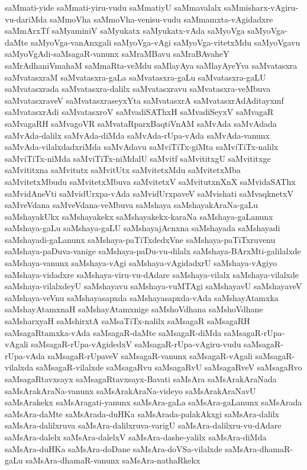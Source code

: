 {saMmati-yide
saMmati-yiru-vudu
saMmatiyU
saMmavalalx
saMmisharx-vAgiru-vu-dariMda
saMmoVha
saMmoVha-venisu-vudu
saMmamxta-vAgidadxre
saMmArxTf
saMyaminiV
saMyukatx
saMyukatx-vAda
saMyoVga
saMyoVga-daMte
saMyoVga-vanAnxgali
saMyoVga-vAgi
saMyoVga-vitetxMdu
saMyoVgavu
saMyoVgAdi-saMsagaR-vanunx
saMraMBavu
saMraBAvaheY
saMrAdhaniVmahaM
saMmaRta-veMdu
saMlayAya
saMlayAyeYva
saMvatasxra
saMvatasxraM
saMvatasxra-gaLa
saMvatasxra-gaLu
saMvatasxra-gaLU
saMvatasxrada
saMvatasxra-dalilx
saMvatasxravu
saMvatasxra-veMbuva
saMvatasxraveV
saMvatasxraseyxYta
saMvatasxrA
saMvatasxrAdAditayxmf
saMvatasxrAdi
saMvatasxroV
saMvadiSAThxH
saMvadiSeyxV
saMvagaR
saMvagaRH
saMvagoVR
saMvataRparxBaqtiVnAM
saMvAda
saMvAdada
saMvAda-dalilx
saMvAda-diMda
saMvAda-rUpa-vAda
saMvAda-vanunx
saMvAda-vilalxdadxriMda
saMvAdavu
saMviTiTx-giMta
saMviTiTx-nalilx
saMviTiTx-niMda
saMviTiTx-niMdalU
saMvitf
saMvititxgU
saMvititxge
saMvititxna
saMvitutx
saMvitUtx
saMvitetxMdu
saMvitetxMba
saMvitetxMbudu
saMvitetxMbuva
saMvitetxV
saMvitutxnXnX
saMvidaSAThx
saMvidAneVti
saMvidUrxpa-vAda
saMvidUrxpaveV
saMvishati
saMvaqknetxV
saMveVdana
saMveVdana-veMbuva
saMshaya
saMshayakAraNa-gaLu
saMshayakUkx
saMshayakekx
saMshayakekx-karaNa
saMshaya-gaLanunx
saMshaya-gaLu
saMshaya-gaLU
saMshayajAcnxna
saMshayada
saMshayadi
saMshayadi-gaLanunx
saMshaya-paTiTxdedxVne
saMshaya-paTiTxruvenu
saMshaya-paDuva-vanige
saMshaya-paDu-vu-dilalx
saMshaya-BArxMti-galilalxde
saMshaya-vanunx
saMshaya-vAgi
saMshaya-vAgidadxrU
saMshaya-vAgiyo
saMshaya-vidadxre
saMshaya-viru-vu-dAdare
saMshaya-vilalx
saMshaya-vilalxde
saMshaya-vilalxdeyU
saMshayavu
saMshaya-vuMTAgi
saMshayavU
saMshayaveV
saMshaya-veVnu
saMshayasapxda
saMshayasapxda-vAda
saMshayAtamxka
saMshayAtamxnaH
saMshayAtamxnige
saMshoVdhana
saMshoVdhane
saMsharxyaH
saMshirxtA
saMsaTiTx-nalilx
saMsagaR
saMsagaRH
saMsagaRtamxka-vAda
saMsagaR-daMte
saMsagaR-diMda
saMsagaR-rUpa-vAgali
saMsagaR-rUpa-vAgidedxV
saMsagaR-rUpa-vAgiru-vudu
saMsagaR-rUpa-vAda
saMsagaR-rUpaveV
saMsagaR-vanunx
saMsagaR-vAgali
saMsagaR-vilalxda
saMsagaR-vilalxde
saMsagaRvu
saMsagaRvU
saMsagaRveV
saMsagaRvo
saMsagaRtavxsayx
saMsagaRtavxsayx-Bavati
saMsAra
saMsArakAraNada
saMsArakAraNa-vanunx
saMsArakAraNa-videyo
saMsArakAraNavU
saMsArakekx
saMsAragati-yanunx
saMsAra-gaLa
saMsAra-gaLanunx
saMsArada
saMsAra-daMte
saMsArada-duHKa
saMsArada-palakAkxgi
saMsAra-dalilx
saMsAra-dalilxruva
saMsAra-dalilxruva-varigU
saMsAra-dalilxru-vu-dAdare
saMsAra-dalelx
saMsAra-dalelxV
saMsAra-dashe-yalilx
saMsAra-diMda
saMsAra-duHKa
saMsAra-doDane
saMsAra-doVSa-vilalxde
saMsAra-dhamaR-gaLu
saMsAra-dhamaR-vanunx
saMsAra-nathaRkekx
}
